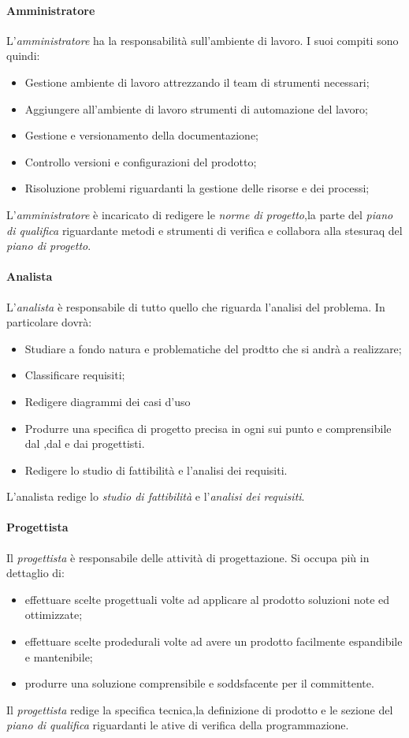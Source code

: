 			\paragraph{Amministratore}
				L'\textit{amministratore} ha la responsabilità sull'ambiente di lavoro.
				I suoi compiti sono quindi:
				\begin{itemize}
					\item Gestione ambiente di lavoro attrezzando il team di strumenti necessari;
					\item Aggiungere all'ambiente di lavoro strumenti di automazione del lavoro;
					\item Gestione e versionamento della documentazione;
					\item Controllo versioni e configurazioni del prodotto;
					\item Risoluzione problemi riguardanti la gestione delle risorse e dei processi;
				\end{itemize}
				L'\textit{amministratore} è incaricato di redigere le \textit{norme di progetto},la parte del \textit{piano di qualifica} riguardante metodi e strumenti di verifica e collabora alla stesuraq del \textit{piano di progetto}.
			\paragraph{Analista}
				L'\textit{analista} è responsabile di tutto quello che riguarda l'analisi del problema.
				In particolare dovrà:
				\begin{itemize}
					\item Studiare a fondo natura e problematiche del prodtto che si andrà a realizzare;
					\item Classificare requisiti;
					\item Redigere diagrammi dei casi d'uso
					\item Produrre una specifica di progetto precisa in ogni sui punto e comprensibile dal ,dal  e dai progettisti.
					\item Redigere lo studio di fattibilità e l'analisi dei requisiti.
				\end{itemize}
				L'analista redige lo \textit{studio di fattibilità} e l'\textit{analisi dei requisiti}.
			\paragraph{Progettista}
				Il \textit{progettista} è responsabile delle attività di progettazione. Si occupa più in dettaglio di:
				\begin{itemize}
					\item effettuare scelte progettuali volte ad applicare al prodotto soluzioni note ed ottimizzate;
					\item effettuare scelte prodedurali volte ad avere un prodotto facilmente espandibile e mantenibile;
					\item produrre una soluzione comprensibile e soddsfacente per il committente.
				\end{itemize}
				Il \textit{progettista} redige la specifica tecnica,la definizione di prodotto e le sezione del \textit{piano di qualifica} riguardanti le  ative di verifica della programmazione.
